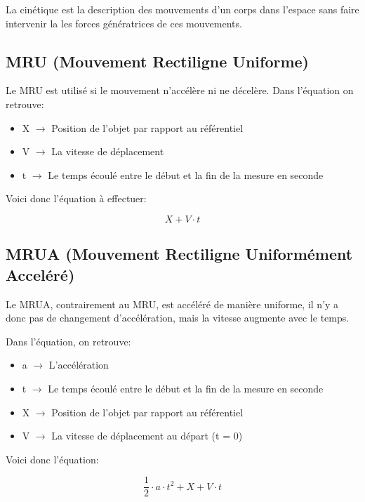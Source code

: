 \documentclass{article}
\begin{document}
La cinétique est la description des mouvements d'un corps dans l'espace sans faire
intervenir la les forces génératrices de ces mouvements.

\subsection{MRU (Mouvement Rectiligne Uniforme)}

Le MRU est utilisé si le mouvement n'accélère ni ne décelère. Dans l'équation on retrouve:
\begin{itemize}
	\item X $\rightarrow$ Position de l'objet par rapport au référentiel
	\item V $\rightarrow$ La vitesse de déplacement
	\item t $\rightarrow$ Le temps écoulé entre le début et la fin de la mesure en seconde
\end{itemize}

Voici donc l'équation à effectuer:

\begin{equation}
  X + V \cdot t
\end{equation}

\subsection{MRUA (Mouvement Rectiligne Uniformément Acceléré)}

Le MRUA, contrairement au MRU, est accéléré de manière uniforme, il n'y a donc pas de changement d'accélération, mais la vitesse augmente avec le temps.

Dans l'équation, on retrouve:
\begin{itemize}
	\item a $\rightarrow$ L'accélération
	\item t $\rightarrow$ Le temps écoulé entre le début et la fin de la mesure en seconde
	\item X $\rightarrow$ Position de l'objet par rapport au référentiel
	\item V $\rightarrow$ La vitesse de déplacement au départ (t = 0)
\end{itemize}

Voici donc l'équation:

\begin{equation}
	\frac{1}{2} \cdot a \cdot t^2 + X + V \cdot t
\end{equation}
\end{document}
